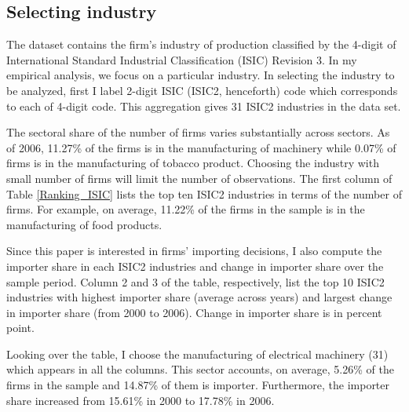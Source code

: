 \documentclass[11pt,letter]{article}
\begin{document}
\begin{appendices}
\subsection{Selecting industry}\label{selectind}



The dataset contains the firm's industry of production classified by the 4-digit of  International Standard Industrial Classification (ISIC) Revision 3. In my empirical analysis, we focus on a particular industry. In selecting the industry to be analyzed, first I label 2-digit ISIC (ISIC2, henceforth) code which corresponds to each of 4-digit code. This aggregation gives 31 ISIC2 industries in the data set.

The sectoral share of the number of firms varies substantially across sectors. As of 2006, 11.27\% of the firms is in the manufacturing of machinery while 0.07\% of firms is in the manufacturing of tobacco product. Choosing the industry with small number of firms will limit the number of observations. The first column of Table \ref{Ranking_ISIC} lists the top ten ISIC2 industries in terms of the number of firms. For example, on average, 11.22\% of the firms in the sample is in the manufacturing of food products. 

Since this paper is interested in firms' importing decisions, I also compute the importer share in each ISIC2 industries and change in importer share over the sample period. Column 2 and 3 of the table, respectively, list the top 10 ISIC2 industries with highest importer share (average across years) and largest change in importer share (from 2000 to 2006). Change in importer share is in percent point. 

Looking over the table, I choose the manufacturing of electrical machinery (31) which appears in all the columns. This sector accounts, on average, 5.26\% of the firms in the sample and 14.87\% of them is importer. Furthermore, the importer share increased from 15.61\% in 2000 to 17.78\% in 2006.


\end{appendices}
\end{document}
